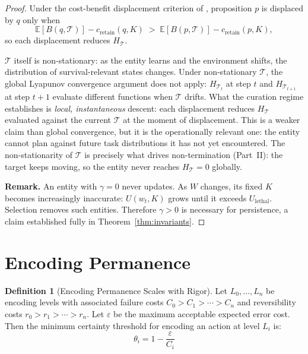 \documentclass[11pt]{article}
\theoremstyle{definition}
\newtheorem{definition}{Definition}
\theoremstyle{remark}
\begin{document}
\begin{proof}
Under the cost-benefit displacement criterion of \cite{McCarthy2026b},
proposition $p$ is displaced by $q$ only when
\[
  \mathbb{E}[B(q, \mathcal{T})] - c_{\text{retain}}(q, K)
  \;>\;
  \mathbb{E}[B(p, \mathcal{T})] - c_{\text{retain}}(p, K),
\]
so each displacement reduces $H_{\mathcal{T}}$.

$\mathcal{T}$ itself is non-stationary: as the entity learns and the
environment shifts, the distribution of survival-relevant states
changes. Under non-stationary $\mathcal{T}$, the global Lyapunov
convergence argument does not apply: $H_{\mathcal{T}_t}$ at step $t$
and $H_{\mathcal{T}_{t+1}}$ at step $t+1$ evaluate different functions
when $\mathcal{T}$ drifts. What the curation regime establishes is
\emph{local, instantaneous} descent: each displacement reduces
$H_{\mathcal{T}}$ evaluated against the current $\mathcal{T}$ at the
moment of displacement. This is a weaker claim than global
convergence, but it is the operationally relevant one: the entity
cannot plan against future task distributions it has not yet
encountered. The non-stationarity of $\mathcal{T}$ is precisely what
drives non-termination (Part~II): the target keeps moving, so the
entity never reaches $H_{\mathcal{T}} = 0$ globally.

\textbf{Remark.} An entity with $\gamma = 0$ never updates. As $W$
changes, its fixed $K$ becomes increasingly inaccurate: $U(w_t, K)$
grows until it exceeds $U_{\mathrm{lethal}}$. Selection removes such
entities. Therefore $\gamma > 0$ is necessary for persistence, a claim
established fully in Theorem~\ref{thm:invariants}.
\end{proof}

\section{Encoding Permanence}
\label{sec:encoding}

\begin{definition}[Encoding Permanence Scales with Rigor]
\label{def:encoding}
Let $L_0, \ldots, L_n$ be encoding levels with associated failure
costs $C_0 > C_1 > \cdots > C_n$ and reversibility costs
$r_0 > r_1 > \cdots > r_n$. Let $\varepsilon$ be the maximum
acceptable expected error cost. Then the minimum certainty threshold
for encoding an action at level $L_i$ is:
\[
\theta_i = 1 - \frac{\varepsilon}{C_i}
\]
\end{definition}
\end{document}
